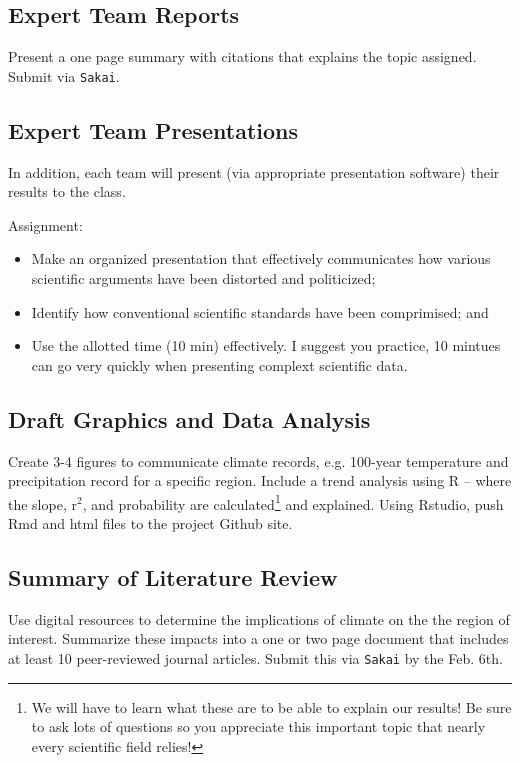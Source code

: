 \documentclass{article}\usepackage[]{graphicx}\usepackage[]{color}
\begin{document}
\subsection{Expert Team Reports}

Present a one page summary with citations that explains the topic assigned. Submit via \texttt{Sakai}. 

\subsection{Expert Team Presentations}

In addition, each team will present (via appropriate presentation software) their results to the class. 

\noindent Assignment: 
\begin{itemize}
  \item Make an organized presentation that effectively communicates how various scientific arguments have been distorted and politicized;
  \item Identify how conventional scientific standards have been comprimised; and
  \item Use the allotted time (10 min) effectively. I suggest you practice, 10 mintues can go very quickly when presenting complext scientific data.
  
\end{itemize}

\subsection{Draft Graphics and Data Analysis}

Create 3-4 figures to communicate climate records, e.g. 100-year temperature and precipitation record for a specific region. Include a trend analysis using R -- where the slope, r$^2$, and probability are calculated\footnote{We will have to learn what these are to be able to explain our results! Be sure to ask lots of questions so you appreciate this important topic that nearly every scientific field relies!} and explained. Using Rstudio, push Rmd and html files to the project Github site. 

\subsection{Summary of Literature Review}

Use digital resources to determine the implications of climate on the the region of interest. Summarize these impacts into a one or two page document that includes at least 10 peer-reviewed journal articles. Submit this via \texttt{Sakai} by the Feb. 6th. 
\end{document}
